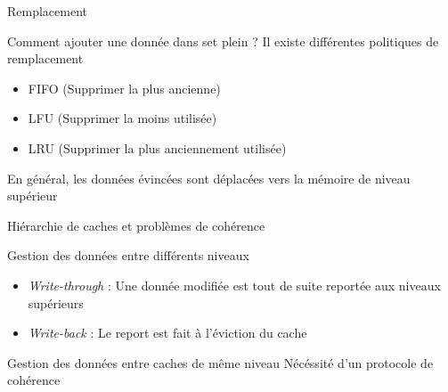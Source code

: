 \begin{frame}{Remplacement}
	\begin{block}{Comment ajouter une donnée dans set plein ?}
		Il existe différentes politiques de remplacement
		\begin{itemize}
			\item{FIFO (Supprimer la plus ancienne)}
			\item{LFU (Supprimer la moins utilisée)}
			\item{LRU (Supprimer la plus anciennement utilisée)}
		\end{itemize}
		En général, les données évincées sont déplacées vers la mémoire de niveau supérieur
	\end{block}
\end{frame}

\begin{frame}{Hiérarchie de caches et problèmes de cohérence}
	\begin{block}{Gestion des données entre différents niveaux}
		\begin{itemize}
			\item{\emph{Write-through} : Une donnée modifiée est tout de suite reportée aux niveaux supérieurs}
			\item{\emph{Write-back} : Le report est fait à l'éviction du cache}
		\end{itemize}
	\end{block}
	\begin{block}{Gestion des données entre caches de même niveau}
		Nécéssité d'un protocole de cohérence
	\end{block}
\end{frame}
